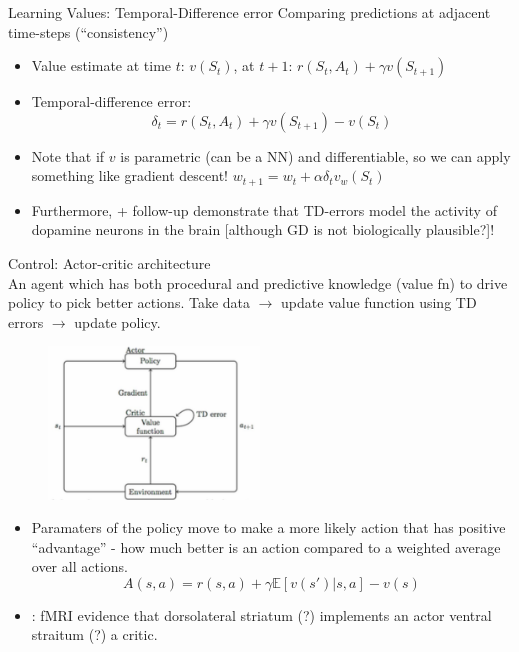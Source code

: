 \documentclass[12pt]{article}
\begin{document}
Learning Values: Temporal-Difference error
Comparing predictions at adjacent time-steps (``consistency'')
\begin{itemize}
    \item Value estimate at time $t$: $v(S_t)$, at $t+1$: $r(S_t, A_t) + \gamma v(S_{t+1})$
    \item Temporal-difference error: $$\delta_t = r(S_t, A_t) + \gamma v(S_{t+1}) - v(S_t)$$
    \item Note that if $v$ is parametric (can be a NN) and differentiable, so we can apply something like gradient descent! $w_{t+1} = w_t + \alpha \delta_tv_w(S_t)$
    \item Furthermore, \cite{schultz97} + follow-up demonstrate that TD-errors model the activity of dopamine neurons in the brain [although GD is not biologically plausible?]!
\end{itemize}

Control: Actor-critic architecture \\

An agent which has both procedural and predictive knowledge (value fn) to drive policy to pick better actions. Take data $\rightarrow$ update value function using TD errors $\rightarrow$ update policy. 
\begin{figure}
  \centering
      \includegraphics[width=0.5\textwidth]{images/aca.png}
  \caption{}
\end{figure}
\begin{itemize}
    \item Paramaters of the policy move to make a more likely action that has positive ``advantage'' - how much better is an action compared to a weighted average over all actions. $$A(s,a) = r(s,a) + \gamma \mathbb{E}[v(s') | s,a] - v(s)$$
    \item \cite{ODoherty04}: fMRI evidence that dorsolateral striatum (?) implements an actor ventral straitum (?) a critic.
\end{itemize}
\end{document}
